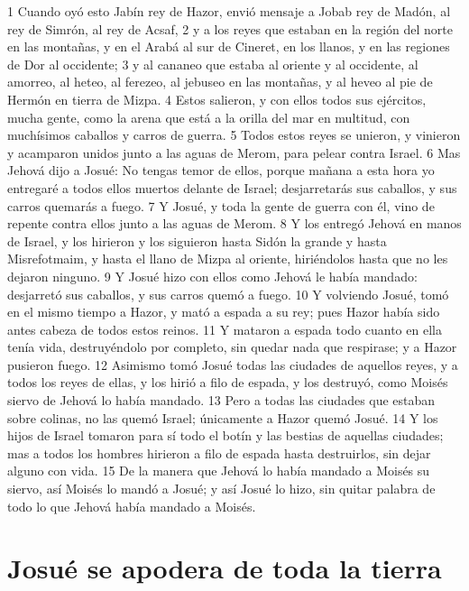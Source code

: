 1 Cuando oyó esto Jabín rey de Hazor, envió mensaje a Jobab rey de Madón, al rey de Simrón, al rey de Acsaf,
2 y a los reyes que estaban en la región del norte en las montañas, y en el Arabá al sur de Cineret, en los llanos, y en las regiones de Dor al occidente;
3 y al cananeo que estaba al oriente y al occidente, al amorreo, al heteo, al ferezeo, al jebuseo en las montañas, y al heveo al pie de Hermón en tierra de Mizpa.
4 Estos salieron, y con ellos todos sus ejércitos, mucha gente, como la arena que está a la orilla del mar en multitud, con muchísimos caballos y carros de guerra.
5 Todos estos reyes se unieron, y vinieron y acamparon unidos junto a las aguas de Merom, para pelear contra Israel.
6 Mas Jehová dijo a Josué: No tengas temor de ellos, porque mañana a esta hora yo entregaré a todos ellos muertos delante de Israel; desjarretarás sus caballos, y sus carros quemarás a fuego.
7 Y Josué, y toda la gente de guerra con él, vino de repente contra ellos junto a las aguas de Merom.
8 Y los entregó Jehová en manos de Israel, y los hirieron y los siguieron hasta Sidón la grande y hasta Misrefotmaim, y hasta el llano de Mizpa al oriente, hiriéndolos hasta que no les dejaron ninguno.
9 Y Josué hizo con ellos como Jehová le había mandado: desjarretó sus caballos, y sus carros quemó a fuego.
10 Y volviendo Josué, tomó en el mismo tiempo a Hazor, y mató a espada a su rey; pues Hazor había sido antes cabeza de todos estos reinos.
11 Y mataron a espada todo cuanto en ella tenía vida, destruyéndolo por completo, sin quedar nada que respirase; y a Hazor pusieron fuego.
12 Asimismo tomó Josué todas las ciudades de aquellos reyes, y a todos los reyes de ellas, y los hirió a filo de espada, y los destruyó, como Moisés siervo de Jehová lo había mandado.
13 Pero a todas las ciudades que estaban sobre colinas, no las quemó Israel; únicamente a Hazor quemó Josué.
14 Y los hijos de Israel tomaron para sí todo el botín y las bestias de aquellas ciudades; mas a todos los hombres hirieron a filo de espada hasta destruirlos, sin dejar alguno con vida.
15 De la manera que Jehová lo había mandado a Moisés su siervo, así Moisés lo mandó a Josué; y así Josué lo hizo, sin quitar palabra de todo lo que Jehová había mandado a Moisés.

\section*{Josué se apodera de toda la tierra}

